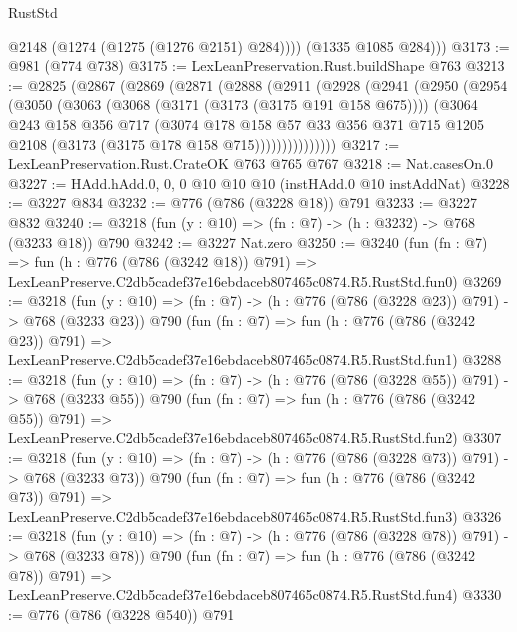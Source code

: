 \begin{lexlean}{RustStd}
\begin{coremodule}
            @2148
            (@1274 (@1275 (@1276 @2151) @284))))
        (@1335 @1085 @284)))
@3173 := @981 (@774 @738)
@3175 := LexLeanPreservation.Rust.buildShape @763
@3213 := @2825
    (@2867
      (@2869
        (@2871
          (@2888
            (@2911
              (@2928
                (@2941
                  (@2950
                    (@2954
                      (@3050
                        (@3063
                          (@3068 (@3171 (@3173 (@3175 @191 @158 @675))))
                          (@3064
                            @243
                            @158
                            @356
                            @717
                            (@3074
                              @178
                              @158
                              @57
                              @33
                              @356
                              @371
                              @715
                              @1205
                              @2108
                              (@3173 (@3175 @178 @158 @715)))))))))))))))
@3217 := LexLeanPreservation.Rust.CrateOK @763 @765 @767
@3218 := Nat.casesOn.{0}
@3227 := HAdd.hAdd.{0, 0, 0} @10 @10 @10 (instHAdd.{0} @10 instAddNat)
@3228 := @3227 @834
@3232 := @776 (@786 (@3228 @18)) @791
@3233 := @3227 @832
@3240 := @3218 (fun (y : @10) => (fn : @7) -> (h : @3232) -> @768 (@3233 @18)) @790
@3242 := @3227 Nat.zero
@3250 := @3240
    (fun (fn : @7) =>
    fun (h : @776 (@786 (@3242 @18)) @791) =>
    LexLeanPreserve.C2db5cadef37e16ebdaceb807465c0874.R5.RustStd.fun0)
@3269 := @3218
    (fun (y : @10) => (fn : @7) -> (h : @776 (@786 (@3228 @23)) @791) -> @768 (@3233 @23))
    @790
    (fun (fn : @7) =>
    fun (h : @776 (@786 (@3242 @23)) @791) =>
    LexLeanPreserve.C2db5cadef37e16ebdaceb807465c0874.R5.RustStd.fun1)
@3288 := @3218
    (fun (y : @10) => (fn : @7) -> (h : @776 (@786 (@3228 @55)) @791) -> @768 (@3233 @55))
    @790
    (fun (fn : @7) =>
    fun (h : @776 (@786 (@3242 @55)) @791) =>
    LexLeanPreserve.C2db5cadef37e16ebdaceb807465c0874.R5.RustStd.fun2)
@3307 := @3218
    (fun (y : @10) => (fn : @7) -> (h : @776 (@786 (@3228 @73)) @791) -> @768 (@3233 @73))
    @790
    (fun (fn : @7) =>
    fun (h : @776 (@786 (@3242 @73)) @791) =>
    LexLeanPreserve.C2db5cadef37e16ebdaceb807465c0874.R5.RustStd.fun3)
@3326 := @3218
    (fun (y : @10) => (fn : @7) -> (h : @776 (@786 (@3228 @78)) @791) -> @768 (@3233 @78))
    @790
    (fun (fn : @7) =>
    fun (h : @776 (@786 (@3242 @78)) @791) =>
    LexLeanPreserve.C2db5cadef37e16ebdaceb807465c0874.R5.RustStd.fun4)
@3330 := @776 (@786 (@3228 @540)) @791

\end{coremodule}
\end{lexlean}
